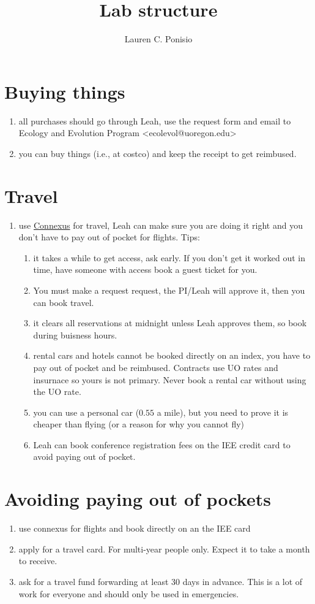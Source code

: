\documentclass[12pt]{article}
\title{Lab structure}
\author{Lauren C. Ponisio}
\begin{document}
\maketitle

\section{Buying things}
\begin{enumerate}
\item all purchases should go through Leah, use the request form and
  email to Ecology and Evolution Program <ecolevol@uoregon.edu>
  \item you can buy things (i.e., at costco) and keep the receipt to
    get reimbused. 
\end{enumerate}

\section{Travel}
\begin{enumerate}
\item use \href{https://ba.uoregon.edu/travel/concur}
  {Connexus} for travel, Leah can make sure you are doing it right and you
  don't have to pay out of pocket for flights. Tips:
  \begin{enumerate}
  \item it takes a while to get access, ask early. If you don't get
    it worked out in time, have someone with access book a guest
    ticket for you.
    \item You must make a request request, the PI/Leah will approve
      it, then you can book travel. 
  \item it clears all reservations at midnight unless Leah approves
    them, so book during buisness hours.
  \item rental cars and hotels cannot be booked directly on an index, you have to pay out
    of pocket and be reimbused. Contracts use UO rates and insurnace
    so yours is not primary. Never book a rental car without using
    the UO rate.
  \item you can use a personal car ($0.55$ a mile), but you need to
    prove it is cheaper than flying (or a reason for why you cannot
    fly)
    \item Leah can book conference registration fees on the IEE credit
      card to avoid paying out of pocket. 
  \end{enumerate}      
\end{enumerate}

\section{Avoiding paying out of pockets}
\begin{enumerate} 
\item use connexus for flights and book directly on an the IEE card
\item apply for a travel card. For multi-year people only. Expect it
  to take a month to receive.
\item ask for a travel fund forwarding at least 30 days in
  advance. This is a lot of work for everyone and should only be
  used in emergencies. 
\end{enumerate}
\end{document}
